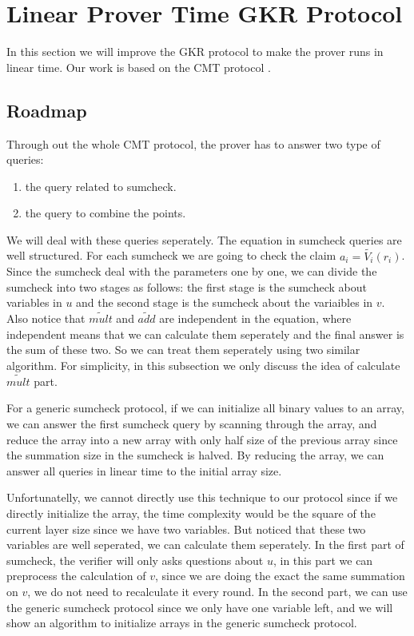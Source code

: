 \section{Linear Prover Time GKR Protocol}
\label{sec::gkrlin}
In this section we will improve the GKR protocol\cite{GKR} to make the prover runs in linear time. Our work is based on the CMT protocol \cite{CMT}.

\subsection{Roadmap}
Through out the whole CMT protocol, the prover has to answer two type of queries:
\begin{enumerate}
	\item the query related to sumcheck.
	\item the query to combine the points. 
\end{enumerate}

We will deal with these queries seperately. The equation in sumcheck queries are well structured. For each sumcheck we are going to check the claim $a_i=\tilde{V_i}(r_i)$. Since the sumcheck deal with the parameters one by one, we can divide the sumcheck into two stages as follows: the first stage is the sumcheck about variables in $u$ and the second stage is the sumcheck about the variaibles in $v$. Also notice that $\tilde{mult}$ and $\tilde{add}$ are independent in the equation, where independent means that we can calculate them seperately and the final answer is the sum of these two. So we can treat them seperately using two similar algorithm. For simplicity, in this subsection we only discuss the idea of calculate $\tilde{mult}$ part. 

For a generic sumcheck protocol, if we can initialize all binary values to an array, we can answer the first sumcheck query by scanning through the array, and reduce the array into a new array with only half size of the previous array since the summation size in the sumcheck is halved. By reducing the array, we can answer all queries in linear time to the initial array size.

Unfortunatelly, we cannot directly use this technique to our protocol since if we directly initialize the array, the time complexity would be the square of the current layer size since we have two variables. But noticed that these two variables are well seperated, we can calculate them seperately. In the first part of sumcheck, the verifier will only asks questions about $u$, in this part we can preprocess the calculation of $v$, since we are doing the exact the same summation on $v$, we do not need to recalculate it every round. In the second part, we can use the generic sumcheck protocol since we only have one variable left, and we will show an algorithm to initialize arrays in the generic sumcheck protocol.


